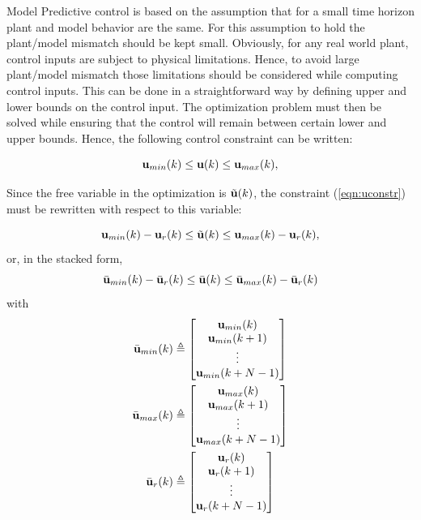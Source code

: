 \documentclass[conference]{IEEEtran} %
\begin{document}
Model Predictive control is based on the assumption that for a small time
horizon plant and model behavior are the same. For this assumption to hold
the plant/model mismatch should be kept small. Obviously, for any real
world plant, control inputs are subject to physical limitations. Hence, to
avoid large plant/model mismatch those limitations should be considered
while computing control inputs. This can be done in a straightforward way by
defining upper and lower bounds on the control input. The optimization
problem must then be solved while ensuring that the control will remain
between certain lower and upper bounds. Hence, the following control
constraint can be written:

\begin{equation}\label{eqn:uconstr}
	{\bf u}_{min}(k) \leq {\bf u}(k) \leq {\bf u}_{max}(k),
\end{equation}

Since the free variable in the optimization is $\tilde{\bf u}(k)$,
the constraint (\ref{eqn:uconstr}) must be rewritten with respect to this
variable:

\begin{equation*}
	{\bf u}_{min}(k) - {\bf u}_r(k) \leq \tilde{\bf u}(k) \leq {\bf u}_{max}(k) - {\bf u}_r(k),
\end{equation*}
or, in the stacked form,
\begin{equation*}
	\bar{\bf u}_{min}(k) - \bar{\bf u}_r(k) \leq \bar{\bf u}(k) \leq \bar{\bf u}_{max}(k) - \bar{\bf u}_r(k)
\end{equation*}
\noindent with
\begin{align*}
	\bar{\bf u}_{min}(k) &\triangleq \begin{bmatrix}
		{\bf u}_{min}(k) \\ {\bf u}_{min}(k+1) \\ \vdots \\ {\bf u}_{min}(k+N-1)
	\end{bmatrix} \\
	\bar{\bf u}_{max}(k) &\triangleq \begin{bmatrix}
		{\bf u}_{max}(k) \\ {\bf u}_{max}(k+1) \\ \vdots \\ {\bf u}_{max}(k+N-1)
	\end{bmatrix} \\
	\bar{\bf u}_r(k) &\triangleq \begin{bmatrix}
		{\bf u}_r(k) \\ {\bf u}_r(k+1) \\ \vdots \\ {\bf u}_r(k+N-1)
	\end{bmatrix}
\end{align*}
\end{document}

